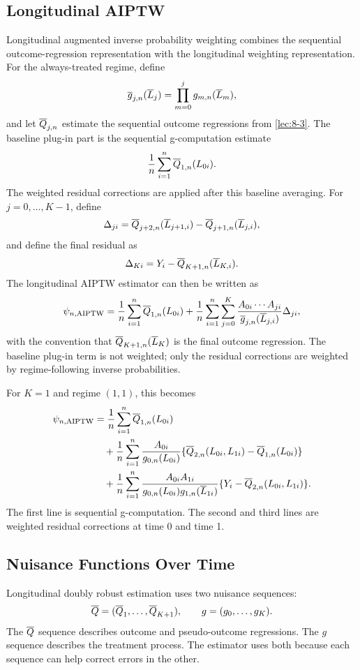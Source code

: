 \label{lec:8-8}

\subsection{Longitudinal AIPTW}

Longitudinal augmented inverse probability weighting combines the sequential
outcome-regression representation with the longitudinal weighting
representation. For the always-treated regime, define
\[
  \overline{g}_{j,n}(\overline{L}_j)=\prod_{m=0}^j g_{m,n}(\overline{L}_m),
\]
and let $\overline{Q}_{j,n}$ estimate the sequential outcome regressions from
\cref{lec:8-3}. The baseline plug-in part is the sequential g-computation
estimate
\[
  \frac{1}{n}\sum_{i=1}^n \overline{Q}_{1,n}(L_{0i}).
\]
The weighted residual corrections are applied after this baseline averaging. For
$j=0,\ldots,K-1$, define
\[
  \Delta_{ji}
  =
  \overline{Q}_{j+2,n}(\overline{L}_{j+1,i})
  -
  \overline{Q}_{j+1,n}(\overline{L}_{j,i}),
\]
and define the final residual as
\[
  \Delta_{Ki}
  =
  Y_i-\overline{Q}_{K+1,n}(\overline{L}_{K,i}).
\]
The longitudinal AIPTW estimator can then be written as
\[
  \psi_{n,\operatorname{AIPTW}}
  =
  \frac{1}{n}\sum_{i=1}^n \overline{Q}_{1,n}(L_{0i})
  +
  \frac{1}{n}\sum_{i=1}^n
  \sum_{j=0}^K
  \frac{A_{0i}\cdots A_{ji}}{\overline{g}_{j,n}(\overline{L}_{j,i})}
  \Delta_{ji},
\]
with the convention that $\overline{Q}_{K+1,n}(\overline{L}_K)$ is the final outcome
regression. The baseline plug-in term is not weighted; only the residual
corrections are weighted by regime-following inverse probabilities.

For $K=1$ and regime $(1,1)$, this becomes
\[
\begin{aligned}
  \psi_{n,\operatorname{AIPTW}}
  &=
  \frac{1}{n}\sum_{i=1}^n \overline{Q}_{1,n}(L_{0i})\\
  &\quad+
  \frac{1}{n}\sum_{i=1}^n
  \frac{A_{0i}}{g_{0,n}(L_{0i})}
  \{\overline{Q}_{2,n}(L_{0i},L_{1i})-\overline{Q}_{1,n}(L_{0i})\}\\
  &\quad+
  \frac{1}{n}\sum_{i=1}^n
  \frac{A_{0i}A_{1i}}{g_{0,n}(L_{0i})g_{1,n}(\overline{L}_{1i})}
  \{Y_i-\overline{Q}_{2,n}(L_{0i},L_{1i})\}.
\end{aligned}
\]
The first line is sequential g-computation. The second and third lines are
weighted residual corrections at time 0 and time 1.

\subsection{Nuisance Functions Over Time}

Longitudinal doubly robust estimation uses two nuisance sequences:
\[
  \overline{Q}=(\overline{Q}_1,\ldots,\overline{Q}_{K+1}),
  \qquad
  g=(g_0,\ldots,g_K).
\]
The $\overline{Q}$ sequence describes outcome and pseudo-outcome regressions. The $g$
sequence describes the treatment process. The estimator uses both because each
sequence can help correct errors in the other.

